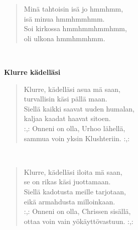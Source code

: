 \noindent\begin{minipage}{\linewidth}
\begin{verse}
	Minä tahtoisin isä jo hmmhmm,\\
	isä minua hmmhmmhmm.\\
	Soi kirkossa hmmhmmhmmhmm,\\
	oli ulkona hmmhmmhmm.\\
\end{verse}
\end{minipage}\\[10pt]
%
%
\noindent\begin{minipage}{\linewidth}
\vspace{5pt}
\parbox[t]{0.85\linewidth}{\raggedright {\large\bf Klurre kädelläsi}\\[6pt]}
\begin{verse}
	Klurre, kädelläsi asua mä saan,\\
	turvallisin käsi pällä maan.\\
	Siellä kaikki saavat uuden humalan,\\
	kaljaa kaadat haavat sitoen.\\
	\hspace{0pt-\widthof{:,: }}:,: Onneni on olla, Urhoo lähellä,\\
	sammua voin yksin Klushteriin. :,:\\
\end{verse}
\end{minipage}\\[10pt]
\noindent\begin{minipage}{\linewidth}
\begin{verse}
	Klurre, kädelläsi iloita mä saan,\\
	se on rikas käsi juottamaan.\\
	Siellä kadotusta meille tarjotaan,\\
	eikä armahdusta milloinkaan.\\
	\hspace{0pt-\widthof{:,: }}:,: Onneni on olla, Chrissen sisällä,\\
	ottaa voin vain yökäyttövastuun. :,:\\
\end{verse}
\end{minipage}\\[10pt]
